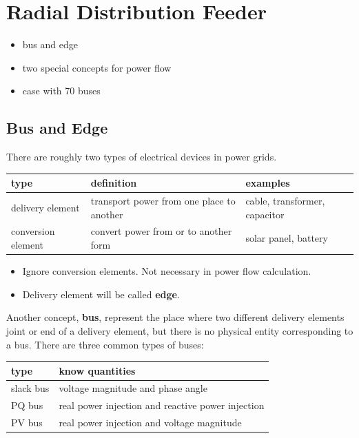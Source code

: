 \documentclass[
]{book}
\providecommand{\tightlist}{%
  \setlength{\itemsep}{0pt}\setlength{\parskip}{0pt}}
\begin{document}
\hypertarget{radial-distribution-feeder}{%
\chapter{Radial Distribution Feeder}\label{radial-distribution-feeder}}

\begin{itemize}
\tightlist
\item
  bus and edge
\item
  two special concepts for power flow
\item
  case with 70 buses
\end{itemize}

\hypertarget{bus-edge}{%
\section{Bus and Edge}\label{bus-edge}}

There are roughly two types of electrical devices in power grids.

\begin{table}[H]
\centering
\begin{tabular}[t]{l|l|l}
\hline
type & definition & examples\\
\hline
delivery element & transport power from one place to another & cable, transformer, capacitor\\
\hline
conversion element & convert power from or to another form & solar panel, battery\\
\hline
\end{tabular}
\end{table}

\begin{itemize}
\tightlist
\item
  Ignore conversion elements. Not necessary in power flow calculation.
\item
  Delivery element will be called \textbf{edge}.
\end{itemize}

Another concept, \textbf{bus}, represent the place where two different delivery
elements joint or end of a delivery element, but there is no physical entity
corresponding to a bus. There are three common types of buses:

\begin{table}[H]
\centering
\begin{tabular}[t]{l|l}
\hline
type & know quantities\\
\hline
slack bus & voltage magnitude and phase angle\\
\hline
PQ bus & real power injection and reactive power injection\\
\hline
PV bus & real power injection and voltage magnitude\\
\hline
\end{tabular}
\end{table}
\end{document}
